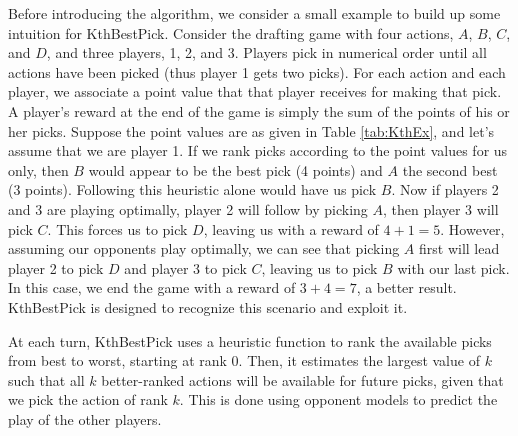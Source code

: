 \documentclass[letterpaper]{article}
\numberwithin{equation}{section}
\numberwithin{theorem}{section}
\numberwithin{lemma}{section}
\numberwithin{df}{section}
\begin{document}


Before introducing the algorithm, we consider a small example to build up some intuition for KthBestPick.  Consider the drafting game with four actions, $A$, $B$, $C$, and $D$, and three players, 1, 2, and 3.  Players pick in numerical order until all actions have been picked (thus player 1 gets two picks).  For each action and each player, we associate a point value that that player receives for making that pick.  A player's reward at the end of the game is simply the sum of the points of his or her picks.  Suppose the point values are as given in Table \ref{tab:KthEx}, and let's assume that we are player 1.  If we rank picks according to the point values for us only, then $B$ would appear to be the best pick (4 points) and $A$ the second best (3 points).  Following this heuristic alone would have us pick $B$.  Now if players 2 and 3 are playing optimally, player 2 will follow by picking $A$, then player 3 will pick $C$.  This forces us to pick $D$, leaving us with a reward of $4 + 1 = 5$.  However, assuming our opponents play optimally, we can see that picking $A$ first will lead player 2 to pick $D$ and player 3 to pick $C$, leaving us to pick $B$ with our last pick.  In this case, we end the game with a reward of $3 + 4 = 7$, a better result.  KthBestPick is designed to recognize this scenario and exploit it.

At each turn, KthBestPick uses a heuristic function to rank the available picks from best to worst, starting at rank 0.  Then, it estimates the largest value of $k$ such that all $k$ better-ranked actions will be available for future picks, given that we pick the action of rank $k$.  This is done using opponent models to predict the play of the other players. %
\end{document}

